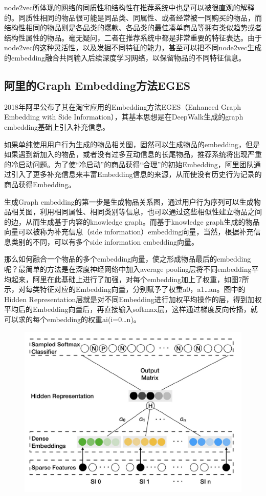 \documentclass[12pt]{article}
\begin{document}
node2vec所体现的网络的同质性和结构性在推荐系统中也是可以被很直观的解释的。同质性相同的物品很可能是同品类、同属性、或者经常被一同购买的物品，而结构性相同的物品则是各品类的爆款、各品类的最佳凑单商品等拥有类似趋势或者结构性属性的物品。毫无疑问，二者在推荐系统中都是非常重要的特征表达。由于node2vec的这种灵活性，以及发掘不同特征的能力，甚至可以把不同node2vec生成的embedding融合共同输入后续深度学习网络，以保留物品的不同特征信息。

\subsection{阿里的Graph Embedding方法EGES}
2018年阿里公布了其在淘宝应用的Embedding方法EGES（Enhanced Graph Embedding with Side Information），其基本思想是在DeepWalk生成的graph embedding基础上引入补充信息。

如果单纯使用用户行为生成的物品相关图，固然可以生成物品的embedding，但是如果遇到新加入的物品，或者没有过多互动信息的长尾物品，推荐系统将出现严重的冷启动问题。为了使“冷启动”的商品获得“合理”的初始Embedding，阿里团队通过引入了更多补充信息来丰富Embedding信息的来源，从而使没有历史行为记录的商品获得Embedding。

生成Graph embedding的第一步是生成物品关系图，通过用户行为序列可以生成物品相关图，利用相同属性、相同类别等信息，也可以通过这些相似性建立物品之间的边，从而生成基于内容的knowledge graph。而基于knowledge graph生成的物品向量可以被称为补充信息（side information）embedding向量，当然，根据补充信息类别的不同，可以有多个side information embedding向量。

那么如何融合一个物品的多个embedding向量，使之形成物品最后的embedding呢？最简单的方法是在深度神经网络中加入average pooling层将不同embedding平均起来，阿里在此基础上进行了加强，对每个embedding加上了权重，如图7所示，对每类特征对应的Embedding向量，分别赋予了权重a0，a1…an。图中的Hidden Representation层就是对不同Embedding进行加权平均操作的层，得到加权平均后的Embedding向量后，再直接输入softmax层，这样通过梯度反向传播，就可以求的每个embedding的权重ai(i=0…n)。
\begin{figure}[H]
    \centering
    \includegraphics[width=.6\textwidth]{fig/Graph_Embedding_In_Ali.jpg}
\end{figure}
\end{document}
